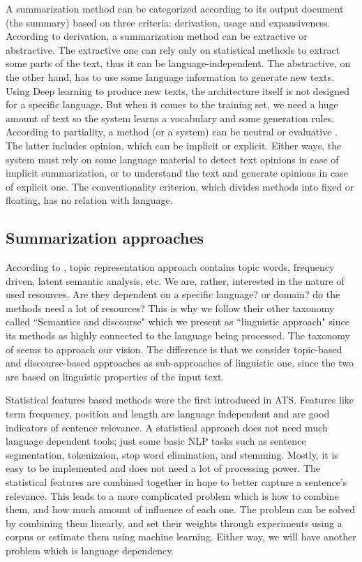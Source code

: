 \documentclass[12pt, oneside, a4paper]{article}
\begin{document}
A summarization method can be categorized according to its output document (the summary) based on three criteria: derivation, usage and expansiveness.
According to derivation, a summarization method can be extractive or abstractive.
The extractive one can rely only on statistical methods to extract some parts of the text, thus it can be language-independent. 
The abstractive, on the other hand, has to use some language information to generate new texts. 
Using Deep learning to produce new texts, the architecture itself is not designed for a specific language. 
But when it comes to the training set, we need a huge amount of text so the system learns a vocabulary and some generation rules. 
According to partiality, a method (or a system) can be neutral or evaluative . 
The latter includes opinion, which can be implicit or explicit. 
Either ways, the system must rely on some language material to detect text opinions in case of implicit summarization, or to understand the text and generate opinions in case of explicit one. 
The conventionality criterion, which divides methods into fixed or floating, has no relation with language. 


\subsection{Summarization approaches}

According to \citet{12-nenkova-mckeown}, topic representation approach contains topic words, frequency driven, latent semantic analysis, etc. 
We are, rather, interested in the nature of used resources.
Are they dependent on a specific language? or domain? do the methods need a lot of resources?
This is why we follow their other taxonomy \citep{11-nenkova-mckeown} called ``Semantics and discourse" which we present as ``linguistic approach" since its methods as highly connected to the language being processed.
The taxonomy of \citet{12-lloret-palomar} seems to approach our vision. 
The difference is that we consider topic-based and discourse-based approaches as sub-approaches of linguistic one, since the two are based on linguistic properties of the input text.

Statistical features based methods were the first introduced in ATS. 
Features like term frequency, position and length are language independent and are good indicators of sentence relevance. 
A statistical approach does not need much language dependent tools; just some basic NLP tasks such as sentence segmentation, tokenizaion, stop word elimination, and stemming. 
Mostly, it is easy to be implemented and does not need a lot of processing power.
The statistical features are combined together in hope to better capture a sentence's relevance. 
This leads to a more complicated problem which is how to combine them, and how much amount of influence of each one. 
The problem can be solved by combining them linearly, and set their weights through experiments using a corpus or estimate them using machine learning.
Either way, we will have another problem which is language dependency. 
\end{document}
